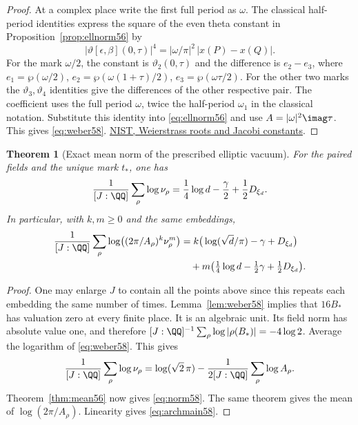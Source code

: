 \documentclass[a4paper,11pt]{article}
\newtheorem{theorem}[proposition]{Theorem}
\theoremstyle{definition}
\theoremstyle{remark}
\numberwithin{equation}{section}
\begin{document}
\begin{proof}
At a complex place write the first full period as \(\omega\).
The classical half-period identities express the square of the
even theta constant in Proposition~\ref{prop:ellnorm56} by
\[
  |\vartheta[\epsilon,\beta](0,\tau)|^4
          =|\omega/\pi|^2\,|x(P)-x(Q)|.
\]
For the mark \(\omega/2\), the constant is \(\vartheta_2(0,\tau)\)
and the difference is \(e_2-e_3\), where
\(e_1=\wp(\omega/2)\), \(e_2=\wp(\omega(1+\tau)/2)\),
\(e_3=\wp(\omega\tau/2)\). For the other two marks the
\(\vartheta_3,\vartheta_4\) identities give the differences of
the other respective pair. The coefficient uses the full period
\(\omega\), twice the half-period \(\omega_1\) in the classical
notation. Substitute this identity into \eqref{eq:ellnorm56}
and use \(A=|\omega|^2\imag\tau\). This gives \eqref{eq:weber58}.
\href{https://dlmf.nist.gov/23.6}{NIST, Weierstrass roots and Jacobi constants}.
\end{proof}

\begin{theorem}[Exact mean norm of the prescribed elliptic vacuum]\label{thm:norm58}
For the paired fields and the unique mark \(t_*\), one has
\begin{equation}
   \frac1{[J:\QQ]}\sum_\rho\log\nu_\rho
       =\frac14\log d-\frac{\gamma}{2}+\frac12D_{\xi_d}.
                                                       \label{eq:norm58}
\end{equation}
In particular, with \(k,m\ge0\) and the same embeddings,
\begin{align}
 \frac1{[J:\QQ]}\sum_\rho\log\!\left((2\pi/A_\rho)^k\nu_\rho^m\right)
   &= k\big(\log(\sqrt d/\pi)-\gamma+D_{\xi_d}\big)       \notag\\
   &\quad +m\big(\tfrac14\log d-\tfrac12\gamma
                                        +\tfrac12D_{\xi_d}\big).
                                                       \label{eq:archmain58}
\end{align}
\end{theorem}
\begin{proof}
One may enlarge \(J\) to contain all the points above since this
repeats each embedding the same number of times. Lemma~\ref{lem:weber58}
implies that \(16B_*\) has valuation zero at every finite place.
It is an algebraic unit. Its field norm has absolute value one,
and therefore \([J:\QQ]^{-1}\sum_\rho\log|\rho(B_*)|=-4\log2\).
Average the logarithm of \eqref{eq:weber58}. This gives
\[
    \frac1{[J:\QQ]}\sum_\rho\log\nu_\rho
      =\log(\sqrt2\,\pi)-\frac1{2[J:\QQ]}\sum_\rho\log A_\rho.
\]
Theorem~\ref{thm:mean56} now gives \eqref{eq:norm58}. The same
theorem gives the mean of \(\log(2\pi/A_\rho)\). Linearity gives
\eqref{eq:archmain58}.
\end{proof}
\end{document}

